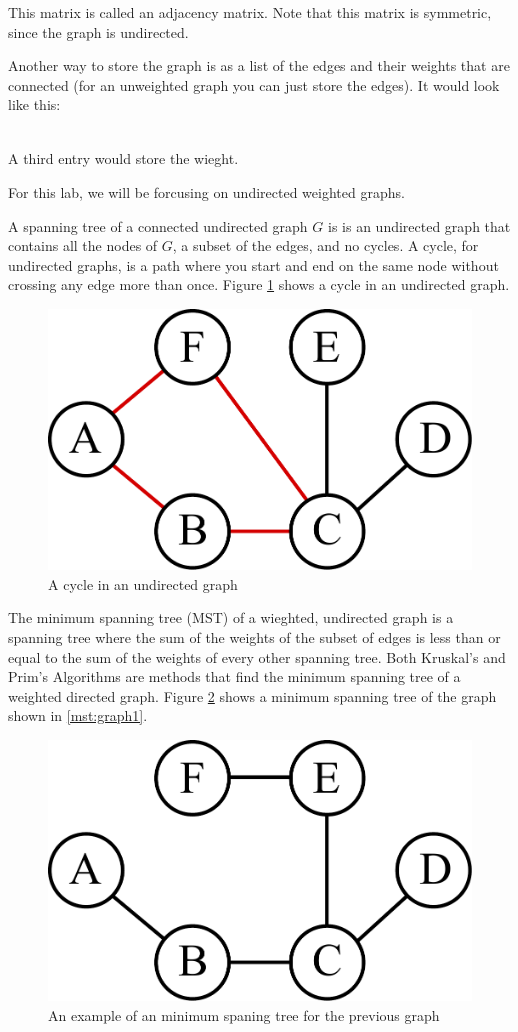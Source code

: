 This matrix is called an adjacency matrix.
Note that this matrix is symmetric, since the graph is undirected. 

Another way to store the graph is as a list of the edges and their weights that are connected (for an unweighted graph you can just store the edges).
It would look like this:

\begin{align*}
[('A', 'B'),
 ('B', 'C'),
 ('B', 'E'),
 ('B', 'F'),
 ('C', 'D'),\\
 ('C', 'E'),
 ('C', 'F'),
 ('D', 'E'),
 ('E', 'F')]
\end{align*}

A third entry would store the wieght.

For this lab, we will be forcusing on undirected weighted graphs. 

A spanning tree of a connected undirected graph $G$ is is an undirected graph that contains all the nodes of $G$, a subset of the edges, and no cycles.
A cycle, for undirected graphs, is a path where you start and end on the same node without crossing any edge more than once.
Figure \ref{mst:graph3} shows a cycle in an undirected graph.

\begin{figure}[H]
\includegraphics[width = .4\textwidth]{graph3.pdf}
\caption{A cycle in an undirected graph}
\label{mst:graph3}
\end{figure}

The minimum spanning tree (MST) of a wieghted, undirected graph is a spanning tree where the sum of the weights of the subset of edges is less than or equal to the sum of the weights of every other spanning tree.
Both Kruskal's and Prim's Algorithms are methods that find the minimum spanning tree of a weighted directed graph.
Figure \ref{mst:graph2} shows a minimum spanning tree of the graph shown in \ref{mst:graph1}.

\begin{figure}[H]
\includegraphics[width = .4\textwidth]{graph2.pdf}
\caption{An example of an minimum spaning tree for the previous graph}
\label{mst:graph2}
\end{figure}

